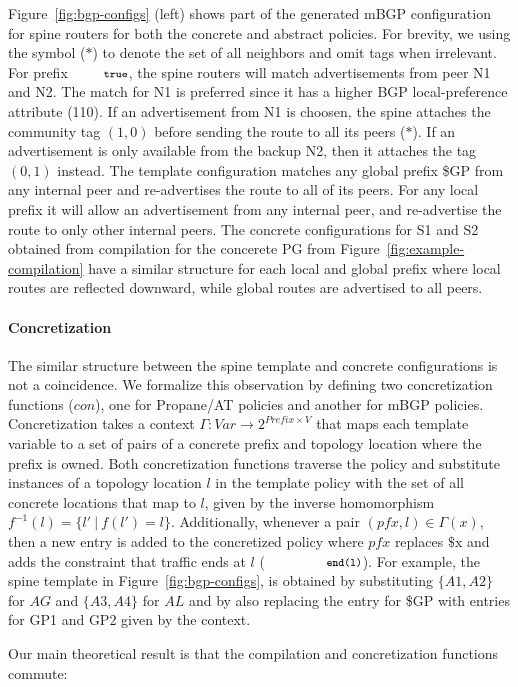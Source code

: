 \documentclass[numbers, 10pt, preprint]{sigplanconf}
\newcommand{\sysname}{{\text{}\small \sf Propane/AT}\xspace}
\newcommand{\mbgp}{{\small \sf mBGP}\xspace}
\newcommand{\para}[1]{\paragraph*{\textbf{#1}}}
\newcommand{\CD}[1]{\texttt{\small #1}}
\newcommand{\KW}[1]{\texttt{\small\bfseries{#1}}}
\newcommand{\True}{\CD{true}}
\newcommand{\End}{\KW{end}}
\begin{document}
Figure~\ref{fig:bgp-configs} (left) shows part of the generated \mbgp configuration for spine routers for both the concrete and abstract policies. For brevity, we using the symbol ($*$) to denote the set of all neighbors and omit tags when irrelevant.
%
For prefix $\True$, the spine routers will match advertisements from peer N1 and N2. The match for N1 is preferred since it has a higher BGP local-preference attribute (110). If an advertisement from N1 is choosen, the spine attaches the community tag $(1,0)$ before sending the route to all its peers ($*$). If an advertisement is only available from the backup N2, then it attaches the tag $(0,1)$ instead.
%
The template configuration matches any global prefix {\small \$GP} from any internal peer and re-advertises the route to all of its peers. For any local prefix it will allow an advertisement from any internal peer, and re-advertise the route to only other internal peers. The concrete configurations for S1 and S2 obtained from compilation for the concerete PG from Figure~\ref{fig:example-compilation} have a similar structure for each local and global prefix where local routes are reflected downward, while global routes are advertised to all peers.


\para{Concretization}
The similar structure between the spine template and concrete configurations is not a coincidence.  We formalize this observation by defining two concretization functions ($con$), one for \sysname policies and another for \mbgp policies. 
%
Concretization takes a context $\Gamma : \mathit{Var} \rightarrow 2^{\mathit{Prefix} \times V}$ that maps each template variable to a set of pairs of a concrete prefix and topology location where the prefix is owned.
%
Both concretization functions traverse the policy and substitute instances of a topology location $l$ in the template policy with the set of all concrete locations that map to $l$, given by the inverse homomorphism $f^{-1}(l) = \{l' ~\vert~ f(l') = l \}$. Additionally, whenever a pair $(pfx,l) \in \Gamma(x)$, then a new entry is added to the concretized policy where $pfx$ replaces $\$\mathrm{x}$ and adds the constraint that traffic ends at $l$ ($\CD{\End(l)}$).
%
For example, the spine template in Figure~\ref{fig:bgp-configs}, is obtained by substituting $\{ A1,A2 \}$ for $AG$ and $\{ A3,A4 \}$ for $AL$ and by also replacing the entry for {\small \$GP} with entries for {\small GP1} and {\small GP2} given by the context.

Our main theoretical result is that the compilation and concretization functions commute:
\end{document}
